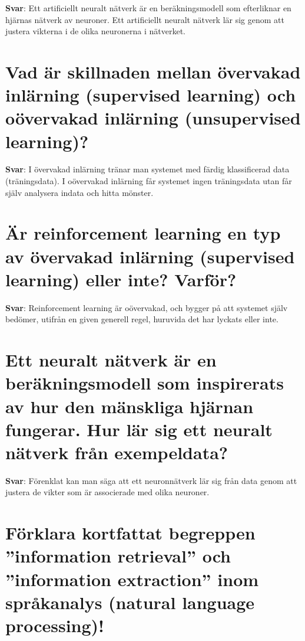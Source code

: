 \documentclass[a4paper,11pt,oneside]{book}
\begin{document}
\begin{sloppypar}
\label{q:314:sa:sv:True}

\textbf{Svar}: Ett artificiellt neuralt n\"atverk \"ar en ber\"akningsmodell som efterliknar en hj\"arnas n\"atverk av neuroner. Ett artificiellt neuralt n\"atverk l\"ar sig genom att justera vikterna i de olika neuronerna i n\"atverket.



\section{Vad \"ar skillnaden mellan \"overvakad inl\"arning (supervised learning) och o\"overvakad inl\"arning (unsupervised learning)?}

\label{q:315:sa:sv:True}

\textbf{Svar}: I \"overvakad inl\"arning tr\"anar man systemet med f\"ardig klassificerad data (tr\"aningsdata). I o\"overvakad inl\"arning f\r{a}r systemet ingen tr\"aningsdata utan f\r{a}r sj\"alv analysera indata och hitta m\"onster.



\section{\"Ar reinforcement learning en typ av \"overvakad inl\"arning (supervised learning) eller inte? Varf\"or?}

\label{q:316:sa:sv:True}

\textbf{Svar}: Reinforcement learning \"ar o\"overvakad, och bygger p\r{a} att systemet sj\"alv bed\"omer, utifr\r{a}n en given generell regel, huruvida det har lyckats eller inte.



\section{Ett neuralt n\"atverk \"ar en ber\"akningsmodell som inspirerats av hur den m\"anskliga hj\"arnan fungerar. Hur l\"ar sig ett neuralt n\"atverk fr\r{a}n exempeldata?}

\label{q:317:sa:sv:True}

\textbf{Svar}: F\"orenklat kan man s\"aga att ett neuronn\"atverk l\"ar sig fr\r{a}n data genom att justera de vikter som \"ar associerade med olika neuroner.



\section{F\"orklara kortfattat begreppen {\textquotedblright}information retrieval{\textquotedblright} och {\textquotedblright}information extraction{\textquotedblright} inom spr\r{a}kanalys (natural language processing)!}


\end{sloppypar}
\end{document}
